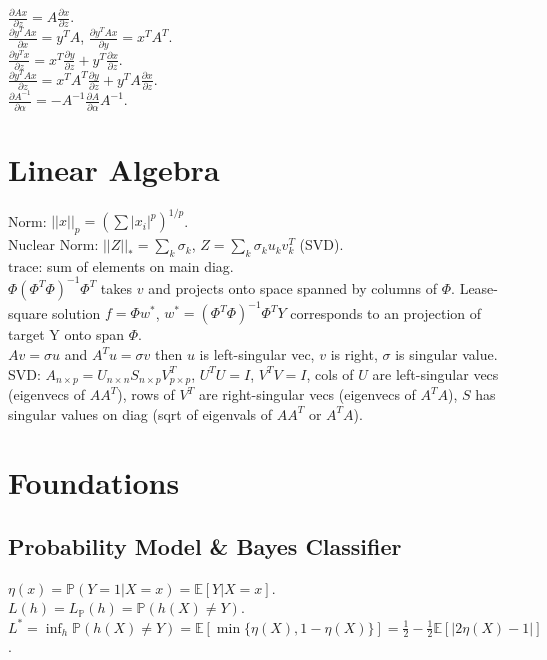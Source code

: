$\frac{\partial Ax}{\partial z} = A\frac{\partial x}{\partial z}$.\\
$\frac{\partial y^T A x}{\partial x} = y^T A$, $\frac{\partial y^T A x}{\partial y} = x^T A^T$.\\
$\frac{\partial y^T x}{\partial z} = x^T\frac{\partial y}{\partial z} + y^T \frac{\partial x}{\partial z}$.\\
$\frac{\partial y^T A x}{\partial z} = x^T A^T \frac{\partial y}{\partial z} + y^T A\frac{\partial x}{\partial z}$.\\
$\frac{\partial A^{-1}}{\partial \alpha} = -A^{-1}\frac{\partial A}{\partial \alpha} A^{-1}$.

\section{Linear Algebra}

Norm: $||x||_p = (\sum |x_i|^p)^{1/p}$.\\
Nuclear Norm: $||Z||_* = \sum_k\sigma_k$, $Z = \sum_k \sigma_k u_k v_k^T$ (SVD).\\
$\text{trace}$: sum of elements on main diag.\\
$\Phi(\Phi^T \Phi)^{-1}\Phi^T$ takes $v$ and projects onto space spanned by columns of $\Phi$. Lease-square solution $f=\Phi w^*$, $w^*=(\Phi^T \Phi)^{-1}\Phi^T Y$ corresponds to an projection of target Y onto span $\Phi$.\\
$Av=\sigma u$ and $A^Tu=\sigma v$ then $u$ is left-singular vec, $v$ is right, $\sigma$ is singular value.\\
SVD: $A_{n\times p} = U_{n\times n}S_{n\times p}V_{p\times p}^T$, $U^TU = I$, $V^TV = I$, cols of $U$ are left-singular vecs (eigenvecs of $AA^T$), rows of $V^T$ are right-singular vecs (eigenvecs of $A^TA$), $S$ has singular values on diag (sqrt of eigenvals of $AA^T$ or $A^TA$).

\section{Foundations}

\subsection*{Probability Model \& Bayes Classifier}

$\eta(x) = \mathbb{P}(Y=1|X=x) = \mathbb{E}[Y|X=x]$.\\
$L(h) = L_{\mathbb{P}}(h) = \mathbb{P}(h(X)\neq Y)$.\\
$L^* = \inf_h \mathbb{P}(h(X) \neq Y) = \mathbb{E}[\min\{\eta(X), 1-\eta(X)\}] = \frac{1}{2} - \frac{1}{2}\mathbb{E}[|2\eta(X) - 1|]$.

